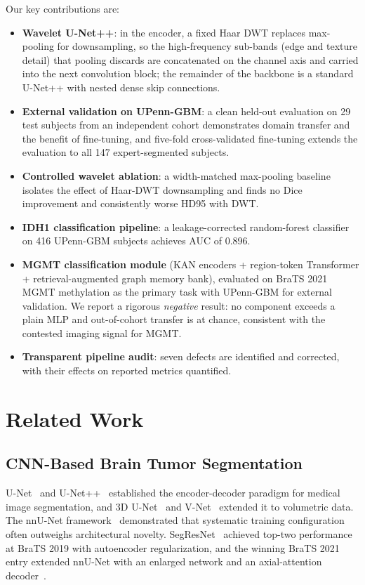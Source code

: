 \documentclass[conference]{IEEEtran}
\begin{document}
Our key contributions are:
\begin{itemize}
    \item \textbf{Wavelet U-Net++}: in the encoder, a fixed Haar DWT replaces max-pooling for downsampling, so the high-frequency sub-bands (edge and texture detail) that pooling discards are concatenated on the channel axis and carried into the next convolution block; the remainder of the backbone is a standard U-Net++ with nested dense skip connections.
    \item \textbf{External validation on UPenn-GBM}: a clean held-out evaluation on 29 test subjects from an independent cohort demonstrates domain transfer and the benefit of fine-tuning, and five-fold cross-validated fine-tuning extends the evaluation to all 147 expert-segmented subjects.
    \item \textbf{Controlled wavelet ablation}: a width-matched max-pooling baseline isolates the effect of Haar-DWT downsampling and finds no Dice improvement and consistently worse HD95 with DWT.
    \item \textbf{IDH1 classification pipeline}: a leakage-corrected random-forest classifier on 416 UPenn-GBM subjects achieves AUC of 0.896.
    \item \textbf{MGMT classification module} (KAN encoders + region-token Transformer + retrieval-augmented graph memory bank), evaluated on BraTS 2021 MGMT methylation as the primary task with UPenn-GBM for external validation. We report a rigorous \emph{negative} result: no component exceeds a plain MLP and out-of-cohort transfer is at chance, consistent with the contested imaging signal for MGMT.
    \item \textbf{Transparent pipeline audit}: seven defects are identified and corrected, with their effects on reported metrics quantified.
\end{itemize}

\section{Related Work}
\label{sec:related}

\subsection{CNN-Based Brain Tumor Segmentation}

U-Net~\cite{ronneberger2015unet} and U-Net++~\cite{zhou2018unetpp} established the encoder-decoder paradigm for medical image segmentation, and 3D U-Net~\cite{cicek2016unet3d} and V-Net~\cite{milletari2016vnet} extended it to volumetric data. The nnU-Net framework~\cite{isensee2021nnu} demonstrated that systematic training configuration often outweighs architectural novelty. SegResNet~\cite{myronenko2019segresnet} achieved top-two performance at BraTS 2019 with autoencoder regularization, and the winning BraTS 2021 entry extended nnU-Net with an enlarged network and an axial-attention decoder~\cite{luu2022extending}.
\end{document}
